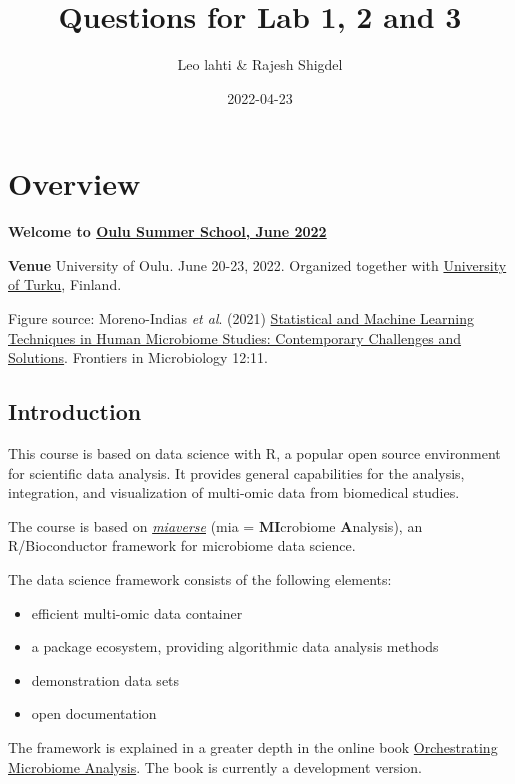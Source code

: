 \documentclass[
  oneside]{book}
\title{Questions for Lab 1, 2 and 3}
\author{Leo lahti \& Rajesh Shigdel}
\date{2022-04-23}
\providecommand{\tightlist}{%
  \setlength{\itemsep}{0pt}\setlength{\parskip}{0pt}}
\begin{document}
\maketitle

{
\setcounter{tocdepth}{1}
\tableofcontents
}
\hypertarget{overview}{%
\chapter{Overview}\label{overview}}

\textbf{Welcome to \href{}{Oulu Summer School, June 2022}}

\textbf{Venue} University of Oulu. June 20-23, 2022.
Organized together with \href{http://datascience.utu.fi}{University of Turku}, Finland.

Figure source: Moreno-Indias \emph{et al}. (2021) \href{https://doi.org/10.3389/fmicb.2021.635781}{Statistical and Machine Learning Techniques in Human Microbiome Studies: Contemporary Challenges and Solutions}. Frontiers in Microbiology 12:11.

\hypertarget{introduction}{%
\section{Introduction}\label{introduction}}

This course is based on data science with R, a popular open source
environment for scientific data analysis. It provides general
capabilities for the analysis, integration, and visualization of
multi-omic data from biomedical studies.

The course is based on \href{https://microbiome.github.io}{\emph{miaverse}} (mia = \textbf{MI}crobiome \textbf{A}nalysis), an
R/Bioconductor framework for microbiome data science.

The data science framework consists of the following elements:

\begin{itemize}
\tightlist
\item
  efficient multi-omic data container
\item
  a package ecosystem, providing algorithmic data analysis methods
\item
  demonstration data sets
\item
  open documentation
\end{itemize}

The framework is explained in a greater depth in the online book
\href{https://microbiome.github.io/OMA}{Orchestrating Microbiome
Analysis}. The book is currently a
development version.
\end{document}
